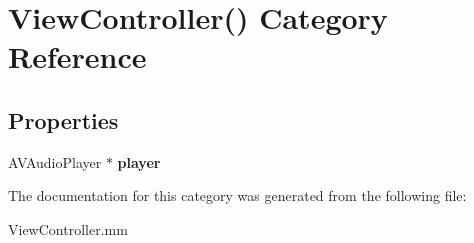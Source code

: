 \hypertarget{category_view_controller_07_08}{}\section{View\+Controller() Category Reference}
\label{category_view_controller_07_08}
\subsection*{Properties}
\begin{DoxyCompactItemize}
\item 
\mbox{\label{category_view_controller_07_08_ad20cdcf7e661043a57407748b371f214}} 
A\+V\+Audio\+Player $\ast$ {\bfseries player}
\end{DoxyCompactItemize}


The documentation for this category was generated from the following file\+:\begin{DoxyCompactItemize}
\item 
View\+Controller.\+mm\end{DoxyCompactItemize}

